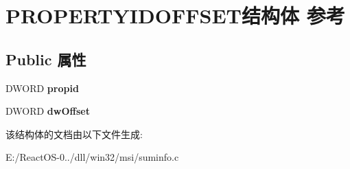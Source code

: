 \hypertarget{struct_p_r_o_p_e_r_t_y_i_d_o_f_f_s_e_t}{}\section{P\+R\+O\+P\+E\+R\+T\+Y\+I\+D\+O\+F\+F\+S\+E\+T结构体 参考}
\label{struct_p_r_o_p_e_r_t_y_i_d_o_f_f_s_e_t}
\subsection*{Public 属性}
\begin{DoxyCompactItemize}
\item 
\mbox{\label{struct_p_r_o_p_e_r_t_y_i_d_o_f_f_s_e_t_ad0edbc1d83db74aecc12f55c6b958665}} 
D\+W\+O\+RD {\bfseries propid}
\item 
\mbox{\label{struct_p_r_o_p_e_r_t_y_i_d_o_f_f_s_e_t_ac27fd7c58197504185b8540d220682be}} 
D\+W\+O\+RD {\bfseries dw\+Offset}
\end{DoxyCompactItemize}


该结构体的文档由以下文件生成\+:\begin{DoxyCompactItemize}
\item 
E\+:/\+React\+O\+S-\/0../dll/win32/msi/suminfo.\+c\end{DoxyCompactItemize}
